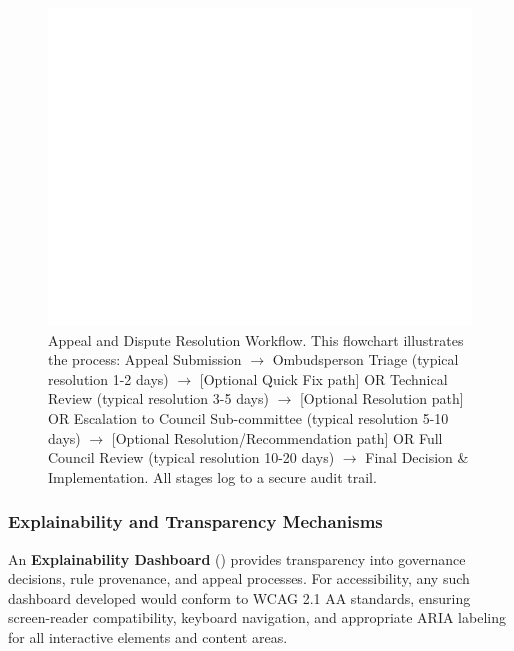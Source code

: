\documentclass[manuscript,screen,review,anonymous,9pt]{acmart}
\begin{document}
\begin{figure}[htbp]
\centering
\includegraphics[width=\linewidth,keepaspectratio]{Figure_1_Appeal_and_Dispute_Resolution_Workflow.png} %
\caption[Appeal and dispute resolution workflow diagram]{Appeal and Dispute Resolution Workflow. This flowchart illustrates the process: Appeal Submission $\rightarrow$ Ombudsperson Triage (typical resolution 1-2 days) $\rightarrow$ [Optional Quick Fix path] OR Technical Review (typical resolution 3-5 days) $\rightarrow$ [Optional Resolution path] OR Escalation to Council Sub-committee (typical resolution 5-10 days) $\rightarrow$ [Optional Resolution/Recommendation path] OR Full Council Review (typical resolution 10-20 days) $\rightarrow$ Final Decision \& Implementation. All stages log to a secure audit trail.}
\label{fig:appeal_workflow}
\end{figure}

\subsubsection{Explainability and Transparency Mechanisms}
\label{subsubsec:democratic_explainability}
An \textbf{Explainability Dashboard} () provides transparency into governance decisions, rule provenance, and appeal processes. For accessibility, any such dashboard developed would conform to WCAG 2.1 AA standards, ensuring screen-reader compatibility, keyboard navigation, and appropriate ARIA labeling for all interactive elements and content areas.
\end{document}

